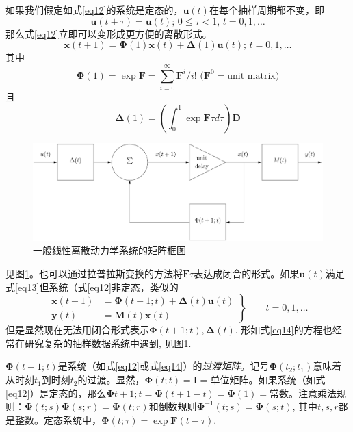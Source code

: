 \documentclass[UTF8,adobefonts]{ctexart}
\newcommand{\boldPhi}{\boldsymbol{\Phi}}
\begin{document}
如果我们假定如式\ref{eq12}的系统是定态的，$\mathbf{u}(t)$在每个抽样周期都不变，即
\begin{equation}
\label{eq13}
\mathbf{u}(t+\tau)=\mathbf{u}(t)\text{; }0 \le \tau < 1\text{, }t=0,1,\dotsc
\end{equation}
那么式\ref{eq12}立即可以变形成更方便的离散形式。
\begin{equation*}
\mathbf{x}(t+1)=\boldsymbol{\Phi}(1)\mathbf{x}(t)+\boldsymbol{\Delta}(1)\mathbf{u}(t)\text{; }t=0,1,\dotsc
\end{equation*}
其中\cite{rf18,rf20}
\begin{equation*}
\boldsymbol{\Phi}(1)=\exp\mathbf{F}=\sum^\infty_{i=0}\mathbf{F}^i/i!\text{ (}\mathbf{F}^0=\text{unit matrix}\text{)}
\end{equation*}
且
\begin{equation*}
\boldsymbol{\Delta}(1)=\left(\int^1_0 \exp\mathbf{F}\tau d \tau\right)\mathbf{D}
\end{equation*}
\begin{figure}[htbp]
\centering
\includegraphics[width=0.5\paperwidth]{fig/fg2.pdf}
\caption{一般线性离散动力学系统的矩阵框图}
\label{fg2}
\end{figure}
见图\ref{fg2}。也可以通过拉普拉斯变换的方法\cite{rf18,rf20,rf22,rf24}将$\mathbf{F}\tau$表达成闭合的形式。如果$\mathbf{u}(t)$满足式\ref{eq13}但系统（式\ref{eq12}非定态，类似的
\begin{equation}
\label{eq14}
\left.\begin{aligned}
\mathbf{x}(t+1)&=\boldsymbol{\Phi}(t+1;t)+\boldsymbol{\Delta}(t)\mathbf{u}(t)\\
\mathbf{y}(t)&=\mathbf{M}(t)\mathbf{x}(t)
\end{aligned}\right\}
\qquad t=0,1,\dotsc
\end{equation}
但是显然现在无法用闭合形式表示$\boldsymbol{\Phi}(t+1;t),\boldsymbol{\Delta}(t)$. 形如式\ref{eq14}的方程也经常在研究复杂的抽样数据系统中遇到\cite{rf22}, 见图\ref{fg2}.

$\boldPhi(t+1;t)$是系统（如式\ref{eq12}或式\ref{eq14}）的\emph{过渡矩阵}。记号$\boldPhi(t_2;t_1)$意味着从时刻$t_1$到时刻$t_2$的过渡。显然，$\boldPhi(t;t)=\mathbf{I}=\text{单位矩阵}$。如果系统（如式\ref{eq12}）是定态的，那么$\boldPhi{t+1;t}=\boldPhi(t+1-t)=\boldPhi(1)=\text{常数}$。注意乘法规则：$\boldPhi(t;s)\boldPhi(s;r)=\boldPhi(t;r)$和倒数规则$\boldPhi^{-1}(t;s)=\boldPhi(s;t)$, 其中$t,s,r$都是整数。定态系统中，$\boldPhi(t;\tau)=\exp \mathbf{F}(t-\tau)$.
\end{document}
